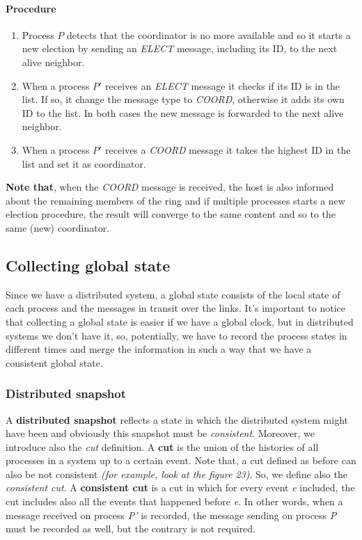 \paragraph{Procedure}
\begin{enumerate}
    \item Process $P$ detects that the coordinator is no more available and so it starts a new election by sending an \textit{ELECT} message, including its ID, to the next alive neighbor.
    \item When a process $P'$ receives an \textit{ELECT} message it checks if its ID is in the list. If so, it change the message type to \textit{COORD}, otherwise it adds its own ID to the list. In both cases the new message is forwarded to the next alive neighbor. 
    \item When a process $P'$ receives a \textit{COORD} message it takes the highest ID in the list and set it as coordinator.
\end{enumerate}

\textbf{Note that}, when the \textit{COORD} message is received, the host is also informed about the remaining members of the ring and if multiple processes starts a new election procedure, the result will converge to the same content and so to the same (new) coordinator.

\subsection{Collecting global state}
Since we have a distributed system, a global state consists of the local state of each process and the messages in transit over the links. It's important to notice that collecting a global state is easier if we have a global clock, but in distributed systems we don't have it, so, potentially, we have to record the process states in different times and merge the information in such a way that we have a consistent global state.

\subsubsection{Distributed snapshot}
A \textbf{distributed snapshot} reflects a state in which the distributed system might have been and obviously this snapshot must be \textit{consistent}. Moreover, we introduce also the \textit{cut} definition. A \textbf{cut} is the union of the histories of all processes in a system up to a certain event. Note that, a cut defined as before can also be not consistent \textit{(for example, look at the figure 23)}. So, we define also the \textit{consistent cut}. A \textbf{consistent cut} is a cut in which for every event \textit{e} included, the cut includes also all the events that happened before \textit{e}. In other words, when a message received on process \textit{P'} is recorded, the message sending on process \textit{P} must be recorded as well, but the contrary is not required. 

